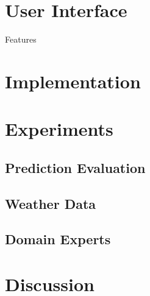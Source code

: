 \documentclass[journal]{vgtc}                %
\begin{document}
\section{User Interface}

Features  

\section{Implementation}

\section{Experiments}


\subsection{Prediction Evaluation}

\subsection{Weather Data}
\subsection{Domain Experts}


\section{Discussion}





\end{document}
